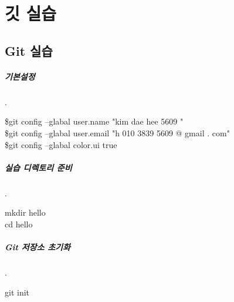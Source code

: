 \documentclass[12pt, a4paper, oneside]{book}
\let\stdsection\section
\renewcommand\section{\newpage\stdsection}
\begin{document}
	\chapter {깃 실습}
	\noptcrule

	\minitoc

%	
	\section 	{ Git 실습}

\paragraph{기본설정}
		.\\


		\begin{tcolorbox}		[
								colback=red!5!white,
								colframe=red!75!black,
								title=깃 기본 설정
								]
			\$git config --glabal user.name  "kim dae hee 5609 " \\
			\$git config --glabal user.email  "h 010 3839 5609 @ gmail . com" \\
			\$git config --glabal color.ui true
		\end{tcolorbox}


\paragraph{실습 디렉토리 준비}
		.\\

		\begin{tcolorbox}
			mkdir hello \\
			cd hello 
		\end{tcolorbox}


\paragraph{Git 저장소 초기화}
		.\\


			\begin{tcolorbox}		[
									title=깃 저장소 초기화
									]
									git init
			\end{tcolorbox}
\end{document}

